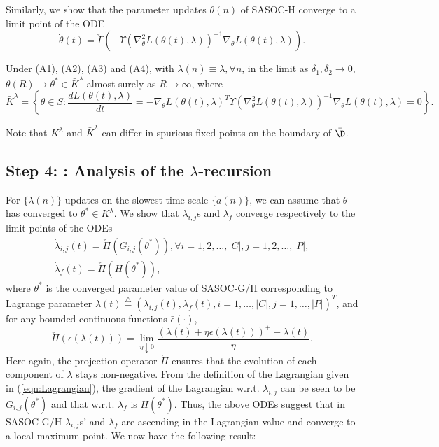\documentclass[11pt,letterpaper,english]{article}
\begin{document}
Similarly, we show that the parameter updates
$\theta(n)$ of SASOC-H converge to a limit point of the ODE
\begin{equation}
\label{eqn:sasoc-h:theta-ode}
\dot{\theta}(t) = \check{\Gamma}\left ( - \Upsilon(\nabla^2_\theta L(\theta(t),
\lambda))^{-1} \nabla_\theta L(\theta(t), \lambda) \right ).
\end{equation}


\begin{theorem}
Under (A1), (A2), (A3) and (A4), with $\lambda(n)\equiv\lambda,\forall n$,
in the limit as $\delta_1, \delta_2 \rightarrow
0$,
$\theta(R) \rightarrow \theta^* \in \bar{K}^{\lambda}$ almost surely as $R
\rightarrow \infty$, where \[\bar{K}^\lambda = \left \{ \theta \in S:
\dfrac{d L (\theta(t),
\lambda)}{dt} = - \nabla_{\theta} L (\theta(t), \lambda)^T
\Upsilon(\nabla^2_\theta L(\theta(t), \lambda))^{-1} \nabla_\theta L(\theta(t),
\lambda) = 0 \right \}.\]
\end{theorem}

Note that $K^\lambda$ and $\bar{K}^\lambda$ can differ in spurious fixed points
on the boundary of $\bar{\D}$.

\subsection*{Step 4: : Analysis of the $\lambda$-recursion}
For $\{\lambda(n)\}$ updates on the slowest time-scale $\{a(n)\}$, we can assume
that $\theta$ has converged to $\theta^* \in K^\lambda$. We show that
$\lambda_{i, j}$s and $\lambda_f$ converge respectively
to the limit points of the ODEs \[\begin{array}{l}
\dot{\lambda}_{i,j}(t) = \check\Pi \left ( G_{i, j}(\theta^*) \right ), \forall
i
=
1, 2, \dots, |C|, j = 1, 2, \dots, |P|,\\[1ex]
\dot{\lambda}_f(t) = \check\Pi \left ( H(\theta^*) \right ),
\end{array}\]
where $\theta^*$ is the converged parameter value of SASOC-G/H corresponding to
Lagrange parameter $\lambda(t) \stackrel{\triangle}{=} (\lambda_{i,j}(t),
\lambda_f(t), i=1,\ldots,|C|, j=1,\ldots,|P|)^T$, and for any bounded continuous
functions $\bar{\epsilon}(\cdot)$, \[\check\Pi(\bar{\epsilon}(\lambda(t))) =
\lim\limits_{\eta \downarrow 0} \dfrac{(\lambda(t) + \eta
\bar{\epsilon}(\lambda(t)))^+ - \lambda(t)}{\eta}.\] 
Here again, the projection
operator $\check\Pi$ ensures that the evolution of each component
of $\lambda$ stays non-negative.
From the definition of the Lagrangian given in (\ref{eqn:Lagrangian}),
the gradient of the Lagrangian w.r.t. $\lambda_{i, j}$ can be seen to  be
$G_{i,j}(\theta^*)$ and that w.r.t. $\lambda_f$ is $H(\theta^*)$. Thus, the
above ODEs suggest that in SASOC-G/H $\lambda_{i, j}$s' and $\lambda_f$ are
ascending in the Lagrangian value and converge to a local maximum point.
We now have the following result:
 
\end{document}
